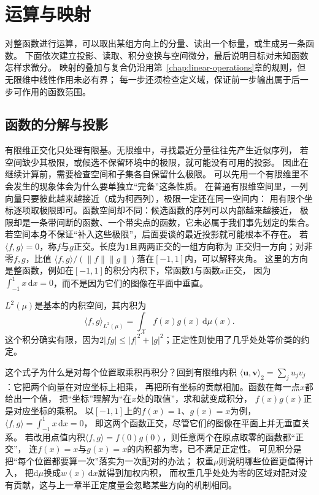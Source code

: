 \section{运算与映射}
\label{sec:functional-operators}

对整函数进行运算，可以取出某组方向上的分量、读出一个标量，或生成另一条函数。
下面依次建立投影、读取、积分变换与空间微分，最后说明目标对未知函数怎样求微分。
映射的叠加与复合仍沿用第~\ref{chap:linear-operations}章的规则，但无限维中线性作用未必有界；
每一步还须检查定义域，保证前一步输出属于后一步可作用的函数范围。

\subsection{函数的分解与投影}
\label{sec:functional-decomposition-projection}
\label{sec:functional-orthogonal-expansions-projections}

\label{sec:functional-projection-approximation}

有限维正交化只处理有限基。无限维中，寻找最近分量往往先产生近似序列，
若空间缺少其极限，或候选不保留环境中的极限，就可能没有可用的投影。
因此在继续计算前，需要检查空间和子集各自保留什么极限。
可以先用一个有限维里不会发生的现象体会为什么要单独立“完备”这条性质。
在普通有限维空间里，一列向量只要彼此越来越接近（成为柯西列），极限一定还在同一空间内：
用有限个坐标逐项取极限即可。函数空间却不同：候选函数的序列可以内部越来越接近，
极限却是一条带间断的函数、一个带尖点的函数，它未必属于我们事先划定的集合。
若空间本身不保证“补入这些极限”，后面要谈的最近投影就可能根本不存在。
若$\langle f,g\rangle=0$，称$f$与$g$正交。长度为$1$且两两正交的一组方向称为
正交归一方向；对非零$f,g$，比值
$\langle f,g\rangle/(\lVert f\rVert\lVert g\rVert)$落在$[-1,1]$内，可以解释夹角。
这里的方向是整函数，例如在$[-1,1]$的积分内积下，常函数$1$与函数$x$正交，
因为$\int_{-1}^1x\,\mathrm dx=0$，而不是因为它们的图像在平面中垂直。

$L^2(\mu)$是基本的内积空间，其内积为
\[
  \langle f,g\rangle_{L^2(\mu)}
  =\int_{\mathcal{X}}f(x)g(x)\,\mathrm{d}\mu(x).
\]
这个积分确实有限，因为$2|fg|\leq |f|^2+|g|^2$；正定性则使用了几乎处处等价类的约定。

这个式子为什么是对每个位置取乘积再积分？回到有限维内积
$\langle\bm u,\bm v\rangle_2=\sum_j u_jv_j$：它把两个向量在对应坐标上相乘，
再把所有坐标的贡献相加。函数在每一点$x$都给出一个值，
把“坐标”理解为“在$x$处的取值”，求和就变成积分，
$f(x)g(x)$正是对应坐标的乘积。
以$[-1,1]$上的$f(x)=1$、$g(x)=x$为例，
$\langle f,g\rangle=\int_{-1}^{1}x\,\mathrm dx=0$，
即这两个函数正交，尽管它们的图像在平面上并无垂直关系。
若改用点值内积$\langle f,g\rangle=f(0)g(0)$，则任意两个在原点取零的函数都“正交”，
连$f(x)=x$与$g(x)=x$的内积都为零，已不满足正定性。
可见积分是把“每个位置都要算一次”落实为一次配对的办法；
权重$\mu$则说明哪些位置更值得计入，
把$\mathrm d\mu$换成$w(x)\,\mathrm dx$就得到加权内积，
而权重几乎处处为零的区域对配对没有贡献，这与上一章半正定度量会忽略某些方向的机制相同。

